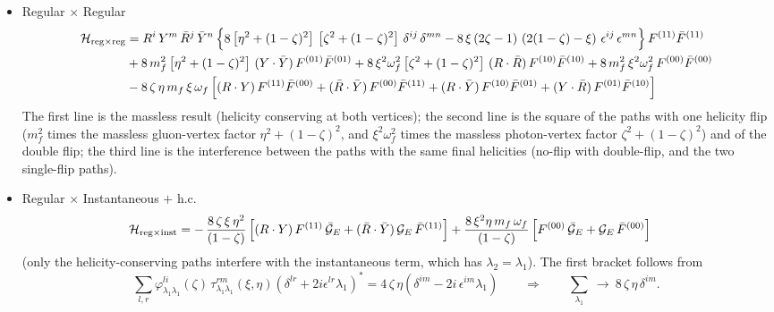 \documentclass[9pt]{article}
\newcommand{\om}{\omega_{f}}                 %
\newcommand{\GE}{\mathcal{G}_{E}}            %
\newcommand{\Hs}{\mathcal{H}}
\numberwithin{equation}{section}
\begin{document}
\begin{itemize}
    \item Regular $\times$ Regular
    \begin{align}
        \Hs_{\text{reg}\times\text{reg}} & = R^{i}\,Y^{m}\,\Bar{R}^{j}\,\Bar{Y}^{n}\,\Big\{8\left[\eta^{2}+(1-\zeta)^{2}\right]\,\left[\zeta^{2}+(1-\zeta)^{2}\right]\,\delta^{ij}\,\delta^{mn} -8\,\xi\,(2\zeta-1)\,\left(2(1-\zeta)-\xi\right)\,\epsilon^{ij}\,\epsilon^{mn}\Big\}\,F^{(11)}\Bar{F}^{(11)} \notag \\
        & + 8\,m^{2}_{f}\left[\eta^{2}+(1-\zeta)^{2}\right]\,(Y\cdot\Bar{Y})\,F^{(01)}\Bar{F}^{(01)} + 8\,\xi^{2}\om^{2}\left[\zeta^{2}+(1-\zeta)^{2}\right]\,(R\cdot\Bar{R})\,F^{(10)}\Bar{F}^{(10)} + 8\,m^{2}_{f}\,\xi^{2}\om^{2}\,F^{(00)}\Bar{F}^{(00)} \notag \\
        & - 8\,\zeta\,\eta\,m_{f}\,\xi\,\om\,\Big[(R\cdot Y)\,F^{(11)}\Bar{F}^{(00)} + (\Bar{R}\cdot\Bar{Y})\,F^{(00)}\Bar{F}^{(11)} + (R\cdot\Bar{Y})\,F^{(10)}\Bar{F}^{(01)} + (Y\cdot\Bar{R})\,F^{(01)}\Bar{F}^{(10)}\Big]
    \end{align}
    The first line is the massless result (helicity conserving at both vertices); the second line is the square of the paths with one helicity flip ($m_{f}^{2}$ times the massless gluon-vertex factor $\eta^{2}+(1-\zeta)^{2}$, and $\xi^{2}\om^{2}$ times the massless photon-vertex factor $\zeta^{2}+(1-\zeta)^{2}$) and of the double flip; the third line is the interference between the paths with the same final helicities (no-flip with double-flip, and the two single-flip paths).
    \item Regular $\times$ Instantaneous $+$ h.c.
    \begin{align}\label{eq:RIqbar}
        \Hs_{\text{reg}\times\text{inst}} & = -\,\frac{8\,\zeta\,\xi\,\eta^{2}}{(1-\zeta)}\,\Big[(R\cdot Y)\,F^{(11)}\,\Bar{\mathcal{G}}_{E}+(\Bar{R}\cdot\Bar{Y})\,\GE\,\Bar{F}^{(11)}\Big] + \frac{8\,\xi^{2}\eta\,m_{f}\,\om}{(1-\zeta)}\,\Big[F^{(00)}\,\Bar{\mathcal{G}}_{E}+\GE\,\Bar{F}^{(00)}\Big]
    \end{align}
    (only the helicity-conserving paths interfere with the instantaneous term, which has $\lambda_{2}=\lambda_{1}$). The first bracket follows from
    $$\sum_{l,r}\varphi^{li}_{\lambda_{1}\lambda_{1}}(\zeta)\,\tau^{rm}_{\lambda_{1}\lambda_{1}}(\xi,\eta)\left(\delta^{lr}+2i\epsilon^{lr}\lambda_{1}\right)^{*} = 4\,\zeta\,\eta\left(\delta^{im}-2i\,\epsilon^{im}\lambda_{1}\right)\hspace{2em}\Rightarrow\hspace{2em}\sum_{\lambda_{1}}\ \rightarrow\ 8\,\zeta\,\eta\,\delta^{im}.$$

\end{itemize}
\end{document}
